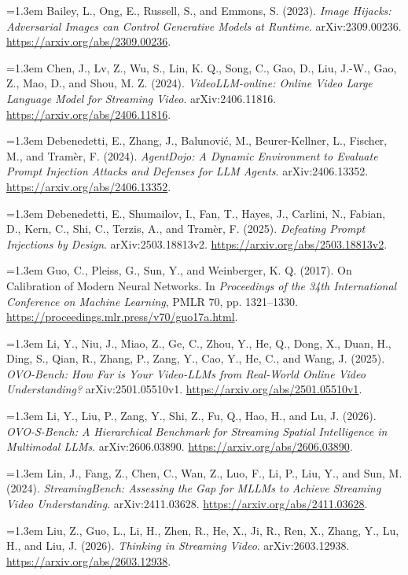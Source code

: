 \documentclass[11pt,letterpaper]{article}
\newcommand{\refentry}[1]{\par\begingroup\small\setlength{\parindent}{0pt}\hangindent=1.3em\hangafter=1 #1\par\endgroup\vspace{5pt}}
\begin{document}
\refentry{Bailey, L., Ong, E., Russell, S., and Emmons, S. (2023). \emph{Image Hijacks: Adversarial Images can Control Generative Models at Runtime}. arXiv:2309.00236. \url{https://arxiv.org/abs/2309.00236}.}

\refentry{Chen, J., Lv, Z., Wu, S., Lin, K. Q., Song, C., Gao, D., Liu, J.-W., Gao, Z., Mao, D., and Shou, M. Z. (2024). \emph{VideoLLM-online: Online Video Large Language Model for Streaming Video}. arXiv:2406.11816. \url{https://arxiv.org/abs/2406.11816}.}

\refentry{Debenedetti, E., Zhang, J., Balunovi\'{c}, M., Beurer-Kellner, L., Fischer, M., and Tram\`er, F. (2024). \emph{AgentDojo: A Dynamic Environment to Evaluate Prompt Injection Attacks and Defenses for LLM Agents}. arXiv:2406.13352. \url{https://arxiv.org/abs/2406.13352}.}

\refentry{Debenedetti, E., Shumailov, I., Fan, T., Hayes, J., Carlini, N., Fabian, D., Kern, C., Shi, C., Terzis, A., and Tram\`er, F. (2025). \emph{Defeating Prompt Injections by Design}. arXiv:2503.18813v2. \url{https://arxiv.org/abs/2503.18813v2}.}

\refentry{Guo, C., Pleiss, G., Sun, Y., and Weinberger, K. Q. (2017). On Calibration of Modern Neural Networks. In \emph{Proceedings of the 34th International Conference on Machine Learning}, PMLR 70, pp. 1321--1330. \url{https://proceedings.mlr.press/v70/guo17a.html}.}

\refentry{Li, Y., Niu, J., Miao, Z., Ge, C., Zhou, Y., He, Q., Dong, X., Duan, H., Ding, S., Qian, R., Zhang, P., Zang, Y., Cao, Y., He, C., and Wang, J. (2025). \emph{OVO-Bench: How Far is Your Video-LLMs from Real-World Online Video Understanding?} arXiv:2501.05510v1. \url{https://arxiv.org/abs/2501.05510v1}.}

\refentry{Li, Y., Liu, P., Zang, Y., Shi, Z., Fu, Q., Hao, H., and Lu, J. (2026). \emph{OVO-S-Bench: A Hierarchical Benchmark for Streaming Spatial Intelligence in Multimodal LLMs}. arXiv:2606.03890. \url{https://arxiv.org/abs/2606.03890}.}

\refentry{Lin, J., Fang, Z., Chen, C., Wan, Z., Luo, F., Li, P., Liu, Y., and Sun, M. (2024). \emph{StreamingBench: Assessing the Gap for MLLMs to Achieve Streaming Video Understanding}. arXiv:2411.03628. \url{https://arxiv.org/abs/2411.03628}.}

\refentry{Liu, Z., Guo, L., Li, H., Zhen, R., He, X., Ji, R., Ren, X., Zhang, Y., Lu, H., and Liu, J. (2026). \emph{Thinking in Streaming Video}. arXiv:2603.12938. \url{https://arxiv.org/abs/2603.12938}.}
\end{document}
